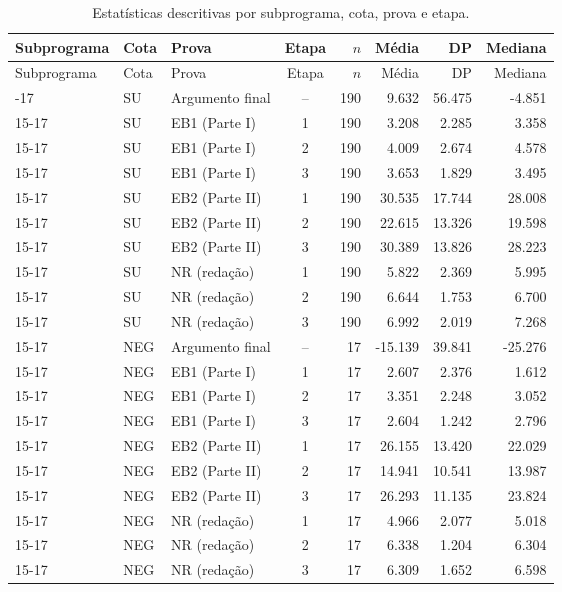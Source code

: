 \begin{longtable}{lllcrrrr}
\caption{Estatísticas descritivas por subprograma, cota, prova e etapa.}\label{tab:t1-descritivas}\\
\toprule
Subprograma & Cota & Prova & Etapa & $n$ & Média & DP & Mediana \\
\midrule
\endfirsthead
\toprule
Subprograma & Cota & Prova & Etapa & $n$ & Média & DP & Mediana \\
\midrule
\endhead
\bottomrule
\endfoot
15-17 & SU & Argumento final & -- & 190 & 9.632 & 56.475 & -4.851 \\
15-17 & SU & EB1 (Parte I) & 1 & 190 & 3.208 & 2.285 & 3.358 \\
15-17 & SU & EB1 (Parte I) & 2 & 190 & 4.009 & 2.674 & 4.578 \\
15-17 & SU & EB1 (Parte I) & 3 & 190 & 3.653 & 1.829 & 3.495 \\
15-17 & SU & EB2 (Parte II) & 1 & 190 & 30.535 & 17.744 & 28.008 \\
15-17 & SU & EB2 (Parte II) & 2 & 190 & 22.615 & 13.326 & 19.598 \\
15-17 & SU & EB2 (Parte II) & 3 & 190 & 30.389 & 13.826 & 28.223 \\
15-17 & SU & NR (redação) & 1 & 190 & 5.822 & 2.369 & 5.995 \\
15-17 & SU & NR (redação) & 2 & 190 & 6.644 & 1.753 & 6.700 \\
15-17 & SU & NR (redação) & 3 & 190 & 6.992 & 2.019 & 7.268 \\
15-17 & NEG & Argumento final & -- & 17 & -15.139 & 39.841 & -25.276 \\
15-17 & NEG & EB1 (Parte I) & 1 & 17 & 2.607 & 2.376 & 1.612 \\
15-17 & NEG & EB1 (Parte I) & 2 & 17 & 3.351 & 2.248 & 3.052 \\
15-17 & NEG & EB1 (Parte I) & 3 & 17 & 2.604 & 1.242 & 2.796 \\
15-17 & NEG & EB2 (Parte II) & 1 & 17 & 26.155 & 13.420 & 22.029 \\
15-17 & NEG & EB2 (Parte II) & 2 & 17 & 14.941 & 10.541 & 13.987 \\
15-17 & NEG & EB2 (Parte II) & 3 & 17 & 26.293 & 11.135 & 23.824 \\
15-17 & NEG & NR (redação) & 1 & 17 & 4.966 & 2.077 & 5.018 \\
15-17 & NEG & NR (redação) & 2 & 17 & 6.338 & 1.204 & 6.304 \\
15-17 & NEG & NR (redação) & 3 & 17 & 6.309 & 1.652 & 6.598 \\

\end{longtable}

